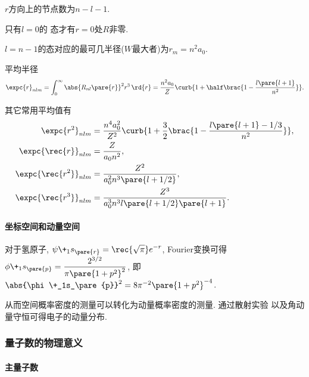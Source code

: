 \documentclass[hidelinks]{ctexart}
\begin{document}
\begin{remark}
    $r$方向上的节点数为$n-l-1$.
\end{remark}
\begin{cenum}
    \item 只有$l=0$的  态才有$r=0$处$R$非零.
    \item $l=n-1$的态对应的最可几半径($W$最大者)为$r_m = n^2 a_0$.
    \item 平均半径
    \begin{align*}
        \expc{r}_{nlm} = \int_0^\infty \abs{R_{nl}\pare{r}}^2r^3\,\rd{r} = \frac{n^2 a_0}{Z}\curb{1 + \half \brac{1-\frac{l\pare{l+1}}{n^2}}}.
    \end{align*}
    \item 其它常用平均值有
    \begin{align*}
        \expc{r^2}_{nlm} &= \frac{n^4 a_0^2}{Z^2} \curb{1+\frac{3}{2}\brac{1 - \frac{l\pare{l+1} - 1/3}{n^2}}}, \\
        \expc{\rec{r}}_{nlm} &= \frac{Z}{a_0 n^2}, \\
        \expc{\rec{r^2}}_{nlm} &= \frac{Z^2}{a_0^2 n^3 \pare{l+1/2}}, \\
        \expc{\rec{r^3}}_{nlm} &= \frac{Z^3}{a_0^3 n^3 l\pare{l+1/2}\pare{l+1}}.
    \end{align*}
\end{cenum}

\paragraph{坐标空间和动量空间} %
\label{par:坐标空间和动量空间}

对于氢原子, $\displaystyle \psi\+_1s_\pare{r} = \rec{\sqrt{\pi}} e^{-r}$, Fourier变换可得$\displaystyle \phi\+_1s_\pare{p} = \frac{2^{3/2}}{\pi\pare{1+p^2}^2}$, 即$\abs{\phi\+_1s_\pare{p}}^2 = 8\pi^{-2} \pare{1+p^2}^{-4}$.
\par
从而空间概率密度的测量可以转化为动量概率密度的测量. 通过散射实验  以及角动量守恒可得电子的动量分布.



\subsubsection{量子数的物理意义} %
\label{ssub:量子数的物理意义}

\paragraph{主量子数} %
\label{par:主量子数}
\end{document}
